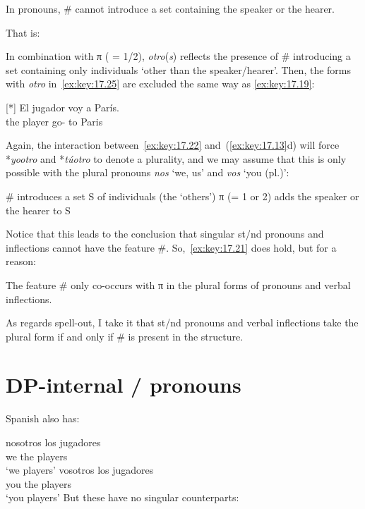\documentclass[output=paper]{langsci/langscibook}
\begin{document}
\begin{exe}
\exi{\eqref{ex:key:17.22}}
    In pronouns, \# cannot introduce a set containing the speaker or the hearer.
\end{exe}
That is:

\ea\label{ex:key:17.26}
    In combination with π ( = 1/2), \emph{otro}(\emph{s}) reflects the presence
    of \# introducing a set containing only individuals ‘other than the
    speaker/hearer’.
\z
Then, the forms with \emph{otro} in~\eqref{ex:key:17.25} are excluded the same
way as \eqref{ex:key:17.19}:

\begin{exe}
\exi{\eqref{ex:key:17.19}}[*]{%
    \gll El jugador voy a París.\\
        the player go-\Fsg{} to Paris\\
    \glt}
\end{exe}
Again, the interaction between~\eqref{ex:key:17.22} and~(\ref{ex:key:17.13}d) will
force *\emph{yootro} and *\emph{túotro} to denote a plurality, and we may
assume that this is only possible with the plural pronouns \emph{nos} ‘we, us’
and \emph{vos} ‘you (pl.)’:

\begin{exe}
\exi{\eqref{ex:key:17.13}}
\begin{xlist}
     \# introduces a set S of individuals (the ‘others’)
     π (= 1 or 2) adds the speaker or the hearer to S
\end{xlist}
\end{exe}
Notice that this leads to the conclusion that singular \First{}st/\Second{}nd
pronouns and inflections cannot have the feature \#. So,~\eqref{ex:key:17.21} does
hold, but for a reason:

\begin{exe}
\exi{\eqref{ex:key:17.21}}
    The feature \# only co-occurs with π in the plural forms of pronouns
    and verbal inflections.
\end{exe}
As regards spell-out, I take it that \First{}st/\Second{}nd pronouns and verbal
inflections take the plural form if and only if \# is present in the structure.

\section{DP-internal \First/\Spl{} pronouns}\label{sec:key:17.6}

Spanish also has:

\ea\label{ex:key:17.27}
    \ea
    \gll    nosotros los jugadores\\
            we          the players\\
    \glt    \enquote*{we players}
    \ex
    \gll    vosotros los jugadores\\
            you          the players\\
    \glt    \enquote*{you players}
    \z
\z
But these have no singular counterparts:
\end{document}
